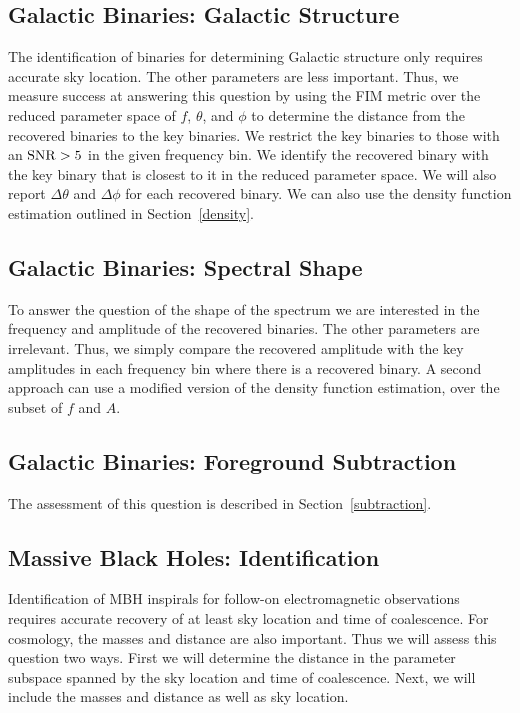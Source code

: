 \documentclass[11pt]{article}
\begin{document}
\subsection{Galactic Binaries: Galactic Structure}
The identification of binaries for determining Galactic structure only requires accurate sky location. The other parameters are less important. Thus, we measure success at answering this question by using the FIM metric over the reduced parameter space of $f$, $\theta$, and $\phi$ to determine the distance from the recovered binaries to the key binaries. We restrict the key binaries to those with an ${\rm SNR} > 5$ in the given frequency bin. We identify the recovered binary with the key binary that is closest to it in the reduced parameter space. We will also report $\Delta\theta$ and $\Delta\phi$ for each recovered binary. We can also use the density function estimation outlined in Section~\ref{density}.

\subsection{Galactic Binaries: Spectral Shape}
To answer the question of the shape of the spectrum we are interested in the frequency and amplitude of the recovered binaries. The other parameters are irrelevant. Thus, we simply compare the recovered amplitude with the key amplitudes in each frequency bin where there is a recovered binary. A second approach can use a modified version of the density function estimation, over the subset of $f$ and $A$.

\subsection{Galactic Binaries: Foreground Subtraction}
The assessment of this question is described in Section~\ref{subtraction}.

\subsection{Massive Black Holes: Identification}
Identification of MBH inspirals for follow-on electromagnetic observations requires accurate recovery of at least sky location and time of coalescence. For cosmology, the masses and distance are also important. Thus we will assess this question two ways. First we will determine the distance in the parameter subspace spanned by the sky location and time of coalescence. Next, we will include the masses and distance as well as sky location.
\end{document}
